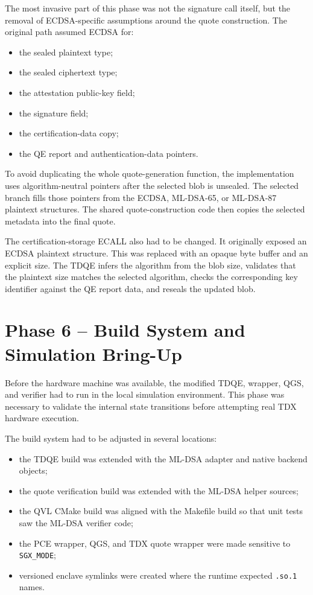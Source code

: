 The most invasive part of this phase was not the signature call itself, but
the removal of ECDSA-specific assumptions around the quote construction. The
original path assumed ECDSA for:

\begin{itemize}
  \item the sealed plaintext type;
  \item the sealed ciphertext type;
  \item the attestation public-key field;
  \item the signature field;
  \item the certification-data copy;
  \item the QE report and authentication-data pointers.
\end{itemize}

To avoid duplicating the whole quote-generation function, the implementation
uses algorithm-neutral pointers after the selected blob is unsealed. The
selected branch fills those pointers from the ECDSA, ML-DSA-65, or ML-DSA-87
plaintext structures. The shared quote-construction code then copies the
selected metadata into the final quote.

The certification-storage ECALL also had to be changed. It originally exposed
an ECDSA plaintext structure. This was replaced with an opaque byte buffer and
an explicit size. The TDQE infers the algorithm from the blob size, validates
that the plaintext size matches the selected algorithm, checks the corresponding
key identifier against the QE report data, and reseals the updated blob.

\section{Phase 6 -- Build System and Simulation Bring-Up}

Before the hardware machine was available, the modified TDQE, wrapper, QGS,
and verifier had to run in the local simulation environment. This phase was
necessary to validate the internal state transitions before attempting real
TDX hardware execution.

The build system had to be adjusted in several locations:

\begin{itemize}
  \item the TDQE build was extended with the ML-DSA adapter and native backend
        objects;
  \item the quote verification build was extended with the ML-DSA helper
        sources;
  \item the QVL CMake build was aligned with the Makefile build so that unit
        tests saw the ML-DSA verifier code;
  \item the PCE wrapper, QGS, and TDX quote wrapper were made sensitive to
        \texttt{SGX\_MODE};
  \item versioned enclave symlinks were created where the runtime expected
        \texttt{.so.1} names.
\end{itemize}

